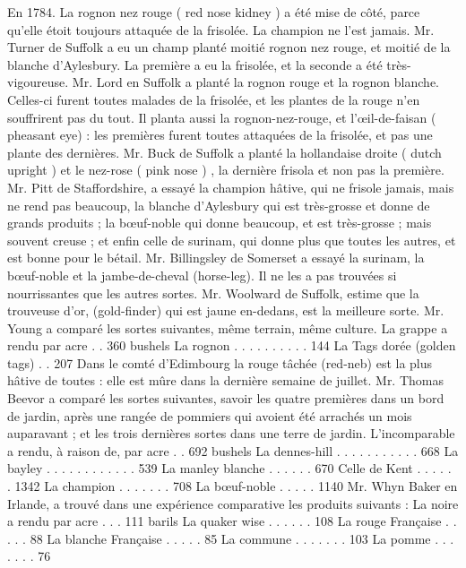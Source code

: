 En 1784. La rognon nez rouge ( red nose kidney ) a été mise de côté, parce qu'elle étoit toujours attaquée de la frisolée. La champion ne l'est jamais.
Mr. Turner de Suffolk a eu un champ planté moitié rognon nez rouge, et moitié de la blanche d'Aylesbury. La première a eu la frisolée, et la seconde a été très-vigoureuse.
Mr. Lord en Suffolk a planté la rognon rouge et la rognon blanche. Celles-ci furent toutes malades de la frisolée, et les plantes de la rouge n'en souffrirent pas du tout. Il planta aussi la rognon-nez-rouge, et l'œil-de-faisan ( pheasant eye) : les premières furent toutes attaquées de la frisolée, et pas une plante des dernières.
Mr. Buck de Suffolk a planté la hollandaise droite ( dutch upright ) et le nez-rose ( pink nose ) , la dernière frisola et non pas la première.
Mr. Pitt de Staffordshire, a essayé la champion hâtive, qui ne frisole jamais, mais ne rend pas beaucoup, la blanche d'Aylesbury qui est très-grosse et donne de grands produits ; la bœuf-noble qui donne beaucoup, et est très-grosse ; mais souvent creuse ; et enfin\setcounter{page}{263} celle de surinam, qui donne plus que toutes les autres, et est bonne pour le bétail.
Mr. Billingsley de Somerset a essayé la surinam, la bœuf-noble et la jambe-de-cheval (horse-leg). Il ne les a pas trouvées si nourrissantes que les autres sortes.
Mr. Woolward de Suffolk, estime que la trouveuse d'or, (gold-finder) qui est jaune en-dedans, est la meilleure sorte.
Mr. Young a comparé les sortes suivantes, même terrain, même culture.
La grappe a rendu par acre . . 360 bushels
La rognon . . . . . . . . . . 144
La Tags dorée (golden tags) . . 207
Dans le comté d'Edimbourg la rouge tâchée (red-neb) est la plus hâtive de toutes : elle est mûre dans la dernière semaine de juillet.
Mr. Thomas Beevor a comparé les sortes suivantes, savoir les quatre premières dans un bord de jardin, après une rangée de pommiers qui avoient été arrachés un mois auparavant ; et les trois dernières sortes dans une terre de jardin.
L'incomparable a rendu, à raison de, par acre . . 692 bushels
La dennes-hill . . . . . . . . . . . 668
La bayley . . . . . . . . . . . . 539
La manley blanche . . . . . . 670\setcounter{page}{264} Celle de Kent . . . . . . 1342
La champion . . . . . . . 708
La bœuf-noble . . . . . 1140
Mr. Whyn Baker en Irlande, a trouvé dans une expérience comparative les produits suivants :
La noire a rendu par acre . . . 111 barils
La quaker wise . . . . . . 108
La rouge Française . . . . . 88
La blanche Française . . . . . 85
La commune . . . . . . . 103
La pomme . . . . . . . 76
